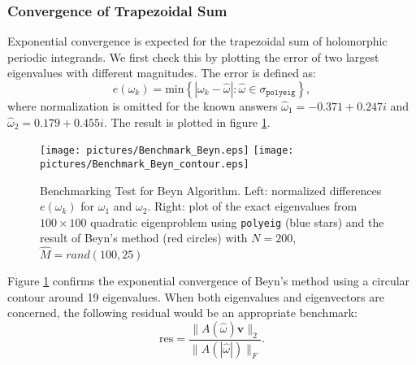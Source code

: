 \documentclass[final,leqno,onefignum,onetabnum]{siamltex1213}
\begin{document}
\subsubsection{Convergence of Trapezoidal Sum}
Exponential convergence is expected for the trapezoidal sum of holomorphic periodic integrands. We first check this by plotting the error of two largest eigenvalues with different magnitudes. The error is defined as: 
\begin{equation}
\label{eq:e}
e(\omega_k) = \mathrm{min}\left\lbrace  |\omega_k - \hat{\omega}|:\hat{\omega}\in\sigma_{\mathtt{polyeig}}\right\rbrace ,
\end{equation}
where normalization is omitted for the known answers  $\hat{\omega}_1 = -0.371 + 0.247i$ and $\hat{\omega}_2=
  0.179 + 0.455i$. The result is plotted in figure \ref{fig:Benchmark_Beyn}. 
\begin{figure}\label{fig:Benchmark_Beyn}
\begin{center}
\texttt{[image: pictures/Benchmark\_Beyn.eps]}
\texttt{[image: pictures/Benchmark\_Beyn\_contour.eps]}
\end{center}
\caption{Benchmarking Test for Beyn Algorithm. \textnormal{Left: normalized differences $e(\omega_k)$ for $\omega_1$ and $\omega_2$. Right: plot of the exact eigenvalues from $100\times100$ quadratic eigenproblem using {\tt polyeig} (blue stars) and the result of Beyn's method (red circles) with $N=200$, $\hat{M}=rand(100,25)$}}
\end{figure}
Figure \ref{fig:Benchmark_Beyn} confirms the exponential convergence of Beyn's method using a circular contour around 19 eigenvalues. When both eigenvalues and eigenvectors are concerned, the following residual would be an appropriate benchmark:
\begin{equation}
\label{eq:Residual}
\mathrm{res}=\frac{\| A(\hat{\omega})\mathbf{\hat{v}} \|_2 }{\|A(|\hat{\omega}|) \|_F}.
\end{equation}

\end{document}
